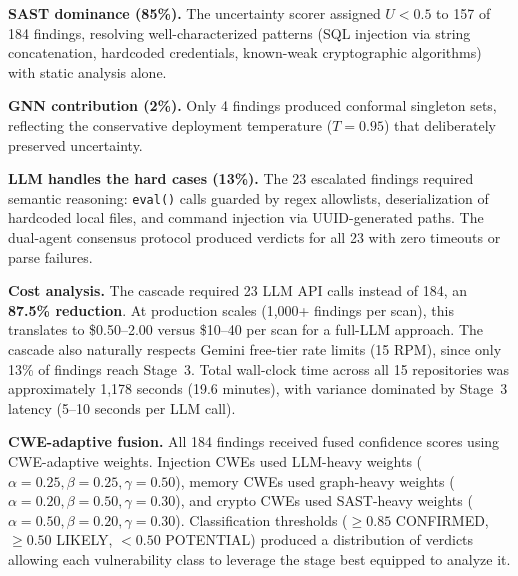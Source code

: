 \textbf{SAST dominance (85\%).} The uncertainty scorer assigned $U < 0.5$ to 157 of 184 findings, resolving well-characterized patterns (SQL injection via string concatenation, hardcoded credentials, known-weak cryptographic algorithms) with static analysis alone.

\textbf{GNN contribution (2\%).} Only 4 findings produced conformal singleton sets, reflecting the conservative deployment temperature ($T = 0.95$) that deliberately preserved uncertainty.

\textbf{LLM handles the hard cases (13\%).} The 23 escalated findings required semantic reasoning: \texttt{eval()} calls guarded by regex allowlists, deserialization of hardcoded local files, and command injection via UUID-generated paths. The dual-agent consensus protocol produced verdicts for all 23 with zero timeouts or parse failures.

\textbf{Cost analysis.} The cascade required 23 LLM API calls instead of 184, an \textbf{87.5\% reduction}. At production scales (1,000+ findings per scan), this translates to \$0.50--2.00 versus \$10--40 per scan for a full-LLM approach. The cascade also naturally respects Gemini free-tier rate limits (15 RPM), since only 13\% of findings reach Stage~3. Total wall-clock time across all 15 repositories was approximately 1,178 seconds (19.6 minutes), with variance dominated by Stage~3 latency (5--10 seconds per LLM call).

\textbf{CWE-adaptive fusion.} All 184 findings received fused confidence scores using CWE-adaptive weights. Injection CWEs used LLM-heavy weights ($\alpha = 0.25, \beta = 0.25, \gamma = 0.50$), memory CWEs used graph-heavy weights ($\alpha = 0.20, \beta = 0.50, \gamma = 0.30$), and crypto CWEs used SAST-heavy weights ($\alpha = 0.50, \beta = 0.20, \gamma = 0.30$). Classification thresholds ($\geq 0.85$ CONFIRMED, $\geq 0.50$ LIKELY, $< 0.50$ POTENTIAL) produced a distribution of verdicts allowing each vulnerability class to leverage the stage best equipped to analyze it.

